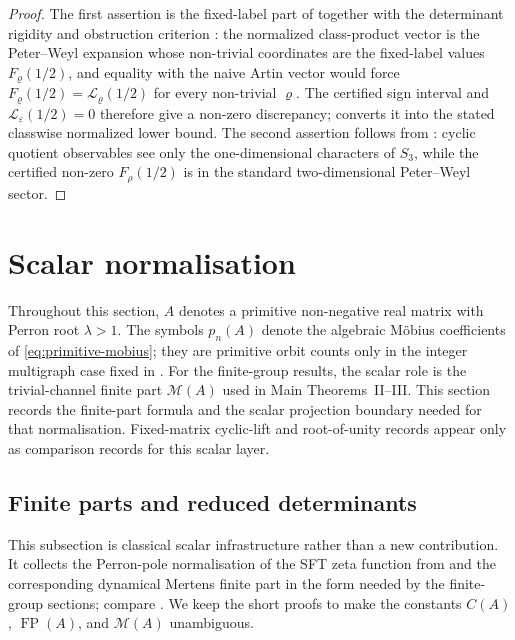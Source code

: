 \documentclass[11pt,a4paper]{amsart}
\theoremstyle{plain}
\theoremstyle{definition}
\theoremstyle{remark}
\DeclareMathOperator{\FP}{FP}
\begin{document}
\begin{proof}
  The first assertion is the fixed-label part of
   together with the determinant
  rigidity and obstruction criterion
  :
  the normalized class-product vector is the Peter--Weyl expansion whose
  non-trivial coordinates are the fixed-label values
  \(F_\varrho(1/2)\), and equality with the naive Artin vector would force
  \(F_\varrho(1/2)=\mathcal L_\varrho(1/2)\) for every non-trivial
  \(\varrho\).  The certified sign interval and
  \(\mathcal L_\varepsilon(1/2)=0\) therefore give a non-zero discrepancy;
   converts it into the stated classwise
  normalized lower bound.  The second assertion follows from
  : cyclic
  quotient observables see only the one-dimensional characters of
  \(S_3\), while the certified non-zero \(F_\rho(1/2)\) is in the standard
  two-dimensional Peter--Weyl sector.
\end{proof}



\section{Scalar normalisation}
\label{sec:finite-part}

Throughout this section, \(A\) denotes a primitive non-negative real
matrix with Perron root \(\lambda>1\). The symbols \(p_n(A)\) denote the
algebraic M\"obius coefficients of \eqref{eq:primitive-mobius}; they are
primitive orbit counts only in the integer multigraph case fixed in
. For the finite-group results, the scalar role is the
trivial-channel finite part \(\mathcal M(A)\) used in Main Theorems~II--III.
This section records the finite-part formula and the scalar projection boundary
needed for that normalisation.  Fixed-matrix cyclic-lift and root-of-unity
records appear only as comparison records for this scalar layer.

\subsection{Finite parts and reduced determinants}

This subsection is classical scalar infrastructure rather than a new
contribution.  It collects the Perron-pole normalisation of the SFT zeta
function from  and the corresponding
dynamical Mertens finite part in the form needed by the finite-group
sections; compare \cite{BowenLanford1970Zeta,Parry1983PrimeOrbit,Sharp1991Mertens,LindMarcus1995,ParryPollicott1990Zeta}.  We keep the
short proofs to make the constants \(C(A)\), \(\FP(A)\), and
\(\mathcal M(A)\) unambiguous.
\end{document}
